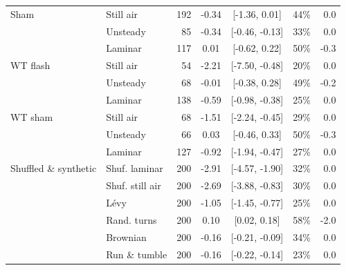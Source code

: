 \begin{table}[ht]
\begin{tabular}{llrccrr}
\hline
Sham & Still air & 192 & -0.34 & [-1.36, 0.01] & 44\% & 0.0 \\
 & Unsteady & 85 & -0.34 & [-0.46, -0.13] & 33\% & 0.0 \\
 & Laminar & 117 & 0.01 & [-0.62, 0.22] & 50\% & -0.3 \\
\hline
WT flash & Still air & 54 & -2.21 & [-7.50, -0.48] & 20\% & 0.0 \\
 & Unsteady & 68 & -0.01 & [-0.38, 0.28] & 49\% & -0.2 \\
 & Laminar & 138 & -0.59 & [-0.98, -0.38] & 25\% & 0.0 \\
\hline
WT sham & Still air & 68 & -1.51 & [-2.24, -0.45] & 29\% & 0.0 \\
 & Unsteady & 66 & 0.03 & [-0.46, 0.33] & 50\% & -0.3 \\
 & Laminar & 127 & -0.92 & [-1.94, -0.47] & 27\% & 0.0 \\
\hline
Shuffled \& synthetic & Shuf. laminar & 200 & -2.91 & [-4.57, -1.90] & 32\% & 0.0 \\
 & Shuf. still air & 200 & -2.69 & [-3.88, -0.83] & 30\% & 0.0 \\
 & L\'evy & 200 & -1.05 & [-1.45, -0.77] & 25\% & 0.0 \\
 & Rand. turns & 200 & 0.10 & [0.02, 0.18] & 58\% & -2.0 \\
 & Brownian & 200 & -0.16 & [-0.21, -0.09] & 34\% & 0.0 \\
 & Run \& tumble & 200 & -0.16 & [-0.22, -0.14] & 23\% & 0.0 \\
\hline
\end{tabular}
\end{table}
